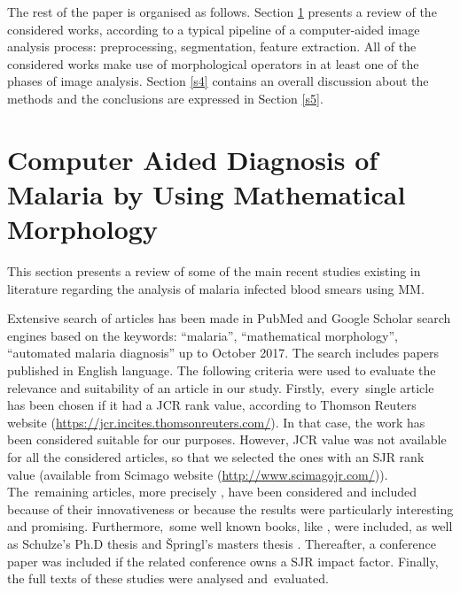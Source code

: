 \documentclass[sensors,review,accept,moreauthors,pdftex,10pt,a4paper]{mdpi}
\begin{document}
The rest of the paper is organised as follows. Section \ref{s3} presents a review of the considered works, according to a typical pipeline of a computer-aided image analysis process: preprocessing, segmentation, feature extraction.
All of the considered works make use of morphological operators in at least one of the phases of image analysis. Section \ref{s4} contains an overall discussion about the methods and the conclusions are expressed in Section \ref{s5}.

\section{Computer Aided Diagnosis of Malaria by Using Mathematical Morphology}\label{s3}
This section presents a review of some of the main recent studies existing in literature regarding the analysis of malaria infected blood smears using MM.

Extensive search of articles has been made in PubMed and Google Scholar search engines based on the keywords: ``malaria'', ``mathematical morphology'', ``automated malaria diagnosis'' up to October 2017. The search includes papers published in English language. The following criteria were used to evaluate the relevance and suitability of an article in our study. \mbox{Firstly, every single} article has been chosen if it had a JCR
rank value, according to Thomson Reuters website \mbox{(\url{https://jcr.incites.thomsonreuters.com/})}. %
 In that case, the work has been considered suitable for our purposes. However, JCR value was not available for all the considered articles, so that we selected the ones with an SJR rank value 
(available from Scimago website \mbox{(\url{http://www.scimagojr.com/})}). The~remaining articles, more precisely \cite{Somasekar2011,Oliveira2017,Somasekar2017,Khan2011,Savkare2011a,Savkare2011b}, have been considered and included because of their innovativeness or because the results were particularly interesting and promising. Furthermore,~some well known books, like \cite{Soille2004,Serra1984,Kerre2000,Das2014}, were included, as well as Schulze's Ph.D thesis \cite{Schulze1994} and {\v{S}}pringl's masters thesis \cite{Springl2009}. Thereafter, a conference paper was included if the related conference owns a SJR impact factor. Finally, the full texts of these studies were analysed and~evaluated.
\end{document}
